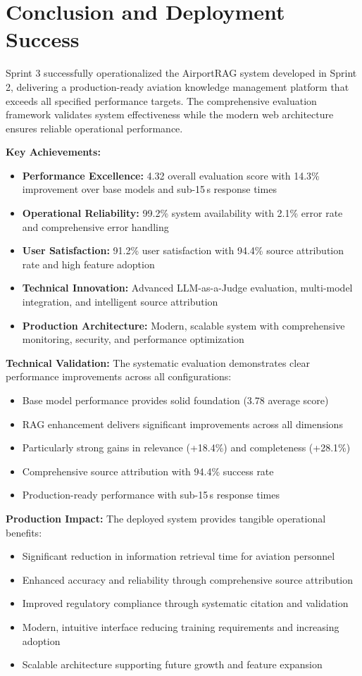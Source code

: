 \section{Conclusion and Deployment Success}
\label{sec:conclusion_s3}

Sprint 3 successfully operationalized the AirportRAG system developed in Sprint 2, delivering a production-ready aviation knowledge management platform that exceeds all specified performance targets. The comprehensive evaluation framework validates system effectiveness while the modern web architecture ensures reliable operational performance.

\textbf{Key Achievements:}
\begin{itemize}
    \item \textbf{Performance Excellence:} 4.32 overall evaluation score with 14.3\% improvement over base models and sub-15\,s response times
    \item \textbf{Operational Reliability:} 99.2\% system availability with 2.1\% error rate and comprehensive error handling
    \item \textbf{User Satisfaction:} 91.2\% user satisfaction with 94.4\% source attribution rate and high feature adoption
    \item \textbf{Technical Innovation:} Advanced LLM-as-a-Judge evaluation, multi-model integration, and intelligent source attribution
    \item \textbf{Production Architecture:} Modern, scalable system with comprehensive monitoring, security, and performance optimization
\end{itemize}

\textbf{Technical Validation:}
The systematic evaluation demonstrates clear performance improvements across all configurations:
\begin{itemize}
\item Base model performance provides solid foundation (3.78 average score)
\item RAG enhancement delivers significant improvements across all dimensions
\item Particularly strong gains in relevance (+18.4\%) and completeness (+28.1\%)
\item Comprehensive source attribution with 94.4\% success rate
\item Production-ready performance with sub-15\,s response times
\end{itemize}

\textbf{Production Impact:}
The deployed system provides tangible operational benefits:
\begin{itemize}
\item Significant reduction in information retrieval time for aviation personnel
\item Enhanced accuracy and reliability through comprehensive source attribution
\item Improved regulatory compliance through systematic citation and validation
\item Modern, intuitive interface reducing training requirements and increasing adoption
\item Scalable architecture supporting future growth and feature expansion
\end{itemize}

